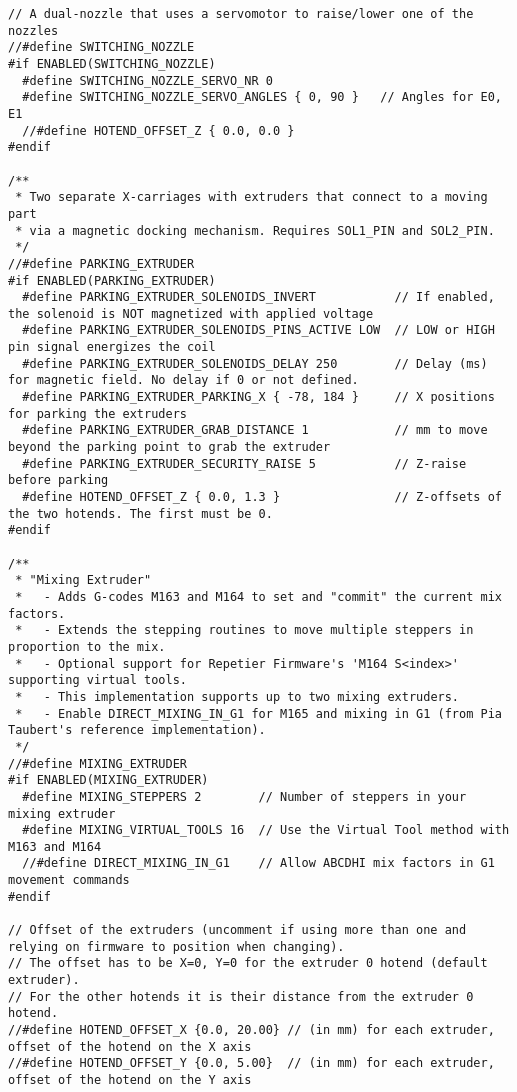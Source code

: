 \begin{lstlisting}
// A dual-nozzle that uses a servomotor to raise/lower one of the nozzles
//#define SWITCHING_NOZZLE
#if ENABLED(SWITCHING_NOZZLE)
  #define SWITCHING_NOZZLE_SERVO_NR 0
  #define SWITCHING_NOZZLE_SERVO_ANGLES { 0, 90 }   // Angles for E0, E1
  //#define HOTEND_OFFSET_Z { 0.0, 0.0 }
#endif

/**
 * Two separate X-carriages with extruders that connect to a moving part
 * via a magnetic docking mechanism. Requires SOL1_PIN and SOL2_PIN.
 */
//#define PARKING_EXTRUDER
#if ENABLED(PARKING_EXTRUDER)
  #define PARKING_EXTRUDER_SOLENOIDS_INVERT           // If enabled, the solenoid is NOT magnetized with applied voltage
  #define PARKING_EXTRUDER_SOLENOIDS_PINS_ACTIVE LOW  // LOW or HIGH pin signal energizes the coil
  #define PARKING_EXTRUDER_SOLENOIDS_DELAY 250        // Delay (ms) for magnetic field. No delay if 0 or not defined.
  #define PARKING_EXTRUDER_PARKING_X { -78, 184 }     // X positions for parking the extruders
  #define PARKING_EXTRUDER_GRAB_DISTANCE 1            // mm to move beyond the parking point to grab the extruder
  #define PARKING_EXTRUDER_SECURITY_RAISE 5           // Z-raise before parking
  #define HOTEND_OFFSET_Z { 0.0, 1.3 }                // Z-offsets of the two hotends. The first must be 0.
#endif

/**
 * "Mixing Extruder"
 *   - Adds G-codes M163 and M164 to set and "commit" the current mix factors.
 *   - Extends the stepping routines to move multiple steppers in proportion to the mix.
 *   - Optional support for Repetier Firmware's 'M164 S<index>' supporting virtual tools.
 *   - This implementation supports up to two mixing extruders.
 *   - Enable DIRECT_MIXING_IN_G1 for M165 and mixing in G1 (from Pia Taubert's reference implementation).
 */
//#define MIXING_EXTRUDER
#if ENABLED(MIXING_EXTRUDER)
  #define MIXING_STEPPERS 2        // Number of steppers in your mixing extruder
  #define MIXING_VIRTUAL_TOOLS 16  // Use the Virtual Tool method with M163 and M164
  //#define DIRECT_MIXING_IN_G1    // Allow ABCDHI mix factors in G1 movement commands
#endif

// Offset of the extruders (uncomment if using more than one and relying on firmware to position when changing).
// The offset has to be X=0, Y=0 for the extruder 0 hotend (default extruder).
// For the other hotends it is their distance from the extruder 0 hotend.
//#define HOTEND_OFFSET_X {0.0, 20.00} // (in mm) for each extruder, offset of the hotend on the X axis
//#define HOTEND_OFFSET_Y {0.0, 5.00}  // (in mm) for each extruder, offset of the hotend on the Y axis


\end{lstlisting}
